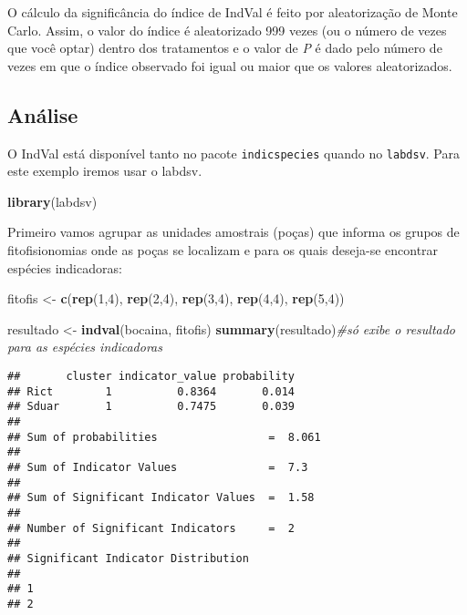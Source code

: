 \documentclass[
]{book}
\newenvironment{Shaded}{\begin{snugshade}}{\end{snugshade}}
\newcommand{\CommentTok}[1]{\textcolor[rgb]{0.56,0.35,0.01}{\textit{#1}}}
\newcommand{\DecValTok}[1]{\textcolor[rgb]{0.00,0.00,0.81}{#1}}
\newcommand{\KeywordTok}[1]{\textcolor[rgb]{0.13,0.29,0.53}{\textbf{#1}}}
\newcommand{\NormalTok}[1]{#1}
\newcommand{\StringTok}[1]{\textcolor[rgb]{0.31,0.60,0.02}{#1}}
\begin{document}
O cálculo da significância do índice de IndVal é feito por aleatorização de Monte Carlo. Assim, o valor do índice é aleatorizado 999 vezes (ou o número de vezes que você optar) dentro dos tratamentos e o valor de \emph{P} é dado pelo número de vezes em que o índice observado foi igual ou maior que os valores aleatorizados.

\hypertarget{anuxe1lise-2}{%
\subsection{Análise}\label{anuxe1lise-2}}

O IndVal está disponível tanto no pacote \texttt{indicspecies} quando no \texttt{labdsv}. Para este exemplo iremos usar o labdsv.

\begin{Shaded}
\begin{Highlighting}[]
\KeywordTok{library}\NormalTok{(labdsv)}
\end{Highlighting}
\end{Shaded}

Primeiro vamos agrupar as unidades amostrais (poças) que informa os grupos de fitofisionomias onde as poças se localizam e para os quais deseja-se encontrar espécies indicadoras:

\begin{Shaded}
\begin{Highlighting}[]
\NormalTok{fitofis <-}\StringTok{ }\KeywordTok{c}\NormalTok{(}\KeywordTok{rep}\NormalTok{(}\DecValTok{1}\NormalTok{,}\DecValTok{4}\NormalTok{), }\KeywordTok{rep}\NormalTok{(}\DecValTok{2}\NormalTok{,}\DecValTok{4}\NormalTok{), }\KeywordTok{rep}\NormalTok{(}\DecValTok{3}\NormalTok{,}\DecValTok{4}\NormalTok{), }\KeywordTok{rep}\NormalTok{(}\DecValTok{4}\NormalTok{,}\DecValTok{4}\NormalTok{), }\KeywordTok{rep}\NormalTok{(}\DecValTok{5}\NormalTok{,}\DecValTok{4}\NormalTok{))}
\end{Highlighting}
\end{Shaded}

\begin{Shaded}
\begin{Highlighting}[]
\NormalTok{resultado <-}\StringTok{ }\KeywordTok{indval}\NormalTok{(bocaina, fitofis)}
\KeywordTok{summary}\NormalTok{(resultado)}\CommentTok{#só exibe o resultado para as espécies indicadoras}
\end{Highlighting}
\end{Shaded}

\begin{verbatim}
##       cluster indicator_value probability
## Rict        1          0.8364       0.014
## Sduar       1          0.7475       0.039
## 
## Sum of probabilities                 =  8.061 
## 
## Sum of Indicator Values              =  7.3 
## 
## Sum of Significant Indicator Values  =  1.58 
## 
## Number of Significant Indicators     =  2 
## 
## Significant Indicator Distribution
## 
## 1 
## 2
\end{verbatim}
\end{document}
